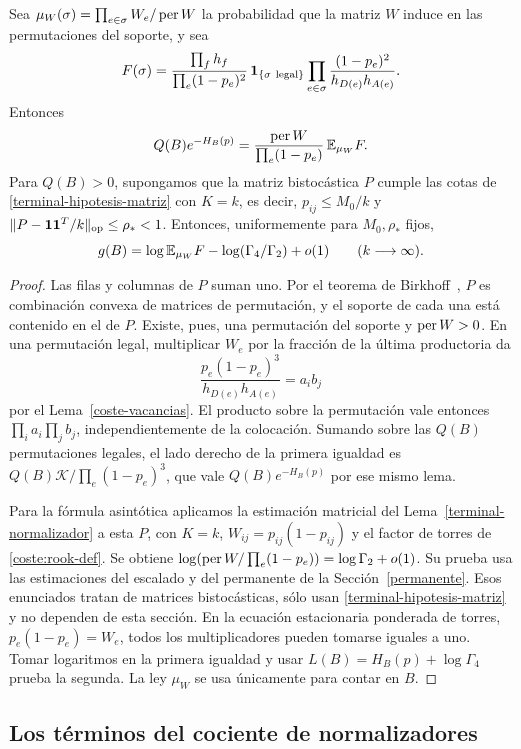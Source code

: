\begin{lema}\label{coste-factor}
Sea $\mu_W(\sigma)=\prod_{e\in\sigma}W_e/\operatorname{per} W$ la probabilidad que la matriz $W$ induce en las
permutaciones del soporte, y sea
\[
 F(\sigma)=
 \frac{\prod_f h_f}{\prod_e(1-p_e)^2}\,
 \mathbf1_{\{\sigma\ {\rm legal}\}}
 \prod_{e\in\sigma}\frac{(1-p_e)^2}{h_{D(e)}h_{A(e)}} .
\]
Entonces
\[
 Q(B)e^{-H_B(p)}
   =\frac{\operatorname{per} W}{\prod_e(1-p_e)}\,\mathbb{E}_{\mu_W}F.
\]
Para $Q(B)>0$, supongamos que la matriz bistocástica $P$ cumple las cotas de
\eqref{terminal-hipotesis-matriz} con $K=k$, es decir, $p_{ij}\le M_0/k$ y
$\|P-\mathbf1\mathbf1^T/k\|_{\rm op}\le\rho_*<1$. Entonces, uniformemente para $M_0,\rho_*$ fijos,
\[
 g(B)=\log\mathbb{E}_{\mu_W}F-\log(\Gamma_4/\Gamma_2)+o(1)
 \qquad (k\longrightarrow\infty).
\]
\end{lema}
\begin{proof}
Las filas y columnas de $P$ suman uno. Por el teorema de Birkhoff~\cite{birkhoff}, $P$ es
combinación convexa de matrices de permutación, y el soporte de cada una está contenido en el de
$P$. Existe, pues, una permutación del soporte y $\operatorname{per} W>0$. En una permutación legal, multiplicar
$W_e$ por la fracción de la última productoria da
\[
 \frac{p_e(1-p_e)^3}{h_{D(e)}h_{A(e)}}=a_i b_j
\]
por el Lema~\ref{coste-vacancias}. El producto sobre la permutación vale entonces $\prod_i a_i\prod_j
b_j$, independientemente de la colocación. Sumando sobre las $Q(B)$ permutaciones legales, el lado
derecho de la primera igualdad es
$Q(B)\mathcal K/\prod_e(1-p_e)^3$, que vale $Q(B)e^{-H_B(p)}$ por ese mismo lema.

Para la fórmula asintótica aplicamos la estimación matricial del Lema~\ref{terminal-normalizador} a
esta $P$, con $K=k$, $W_{ij}=p_{ij}(1-p_{ij})$ y el factor de torres de \eqref{coste:rook-def}. Se
obtiene $\log(\operatorname{per} W/\prod_e(1-p_e))=\log\Gamma_2+o(1)$. Su prueba usa las estimaciones del escalado
y del permanente de la Sección~\ref{permanente}. Esos enunciados tratan de matrices bistocásticas,
sólo usan \eqref{terminal-hipotesis-matriz} y no dependen de esta sección. En la ecuación estacionaria
ponderada de torres,
$p_e(1-p_e)=W_e$, todos los multiplicadores pueden tomarse iguales a uno. Tomar logaritmos en la
primera igualdad y usar $L(B)=H_B(p)+\log\Gamma_4$ prueba la
segunda. La ley $\mu_W$ se usa únicamente para contar en $B$.
\end{proof}

\subsection{Los términos del cociente de normalizadores}

